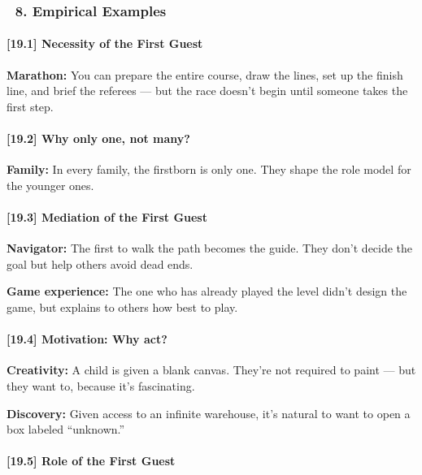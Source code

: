 \documentclass[12pt]{article}
\begin{document}
\subsubsection*{🔹 8. Empirical Examples}

\paragraph{\textbf{[19.1] Necessity of the First Guest}}

\textbf{Marathon:} You can prepare the entire course, draw the lines, set up the finish line, and brief the referees — but the race doesn’t begin until someone takes the first step.

\bigskip

\paragraph{\textbf{[19.2] Why only one, not many?}}

\textbf{Family:} In every family, the firstborn is only one. They shape the role model for the younger ones.

\bigskip

\paragraph{\textbf{[19.3] Mediation of the First Guest}}

\textbf{Navigator:} The first to walk the path becomes the guide. They don’t decide the goal but help others avoid dead ends.

\textbf{Game experience:} The one who has already played the level didn’t design the game, but explains to others how best to play.

\bigskip

\paragraph{\textbf{[19.4] Motivation: Why act?}}

\textbf{Creativity:} A child is given a blank canvas. They’re not required to paint — but they want to, because it’s fascinating.

\textbf{Discovery:} Given access to an infinite warehouse, it’s natural to want to open a box labeled ``unknown.''

\bigskip

\paragraph{\textbf{[19.5] Role of the First Guest}}
\end{document}
